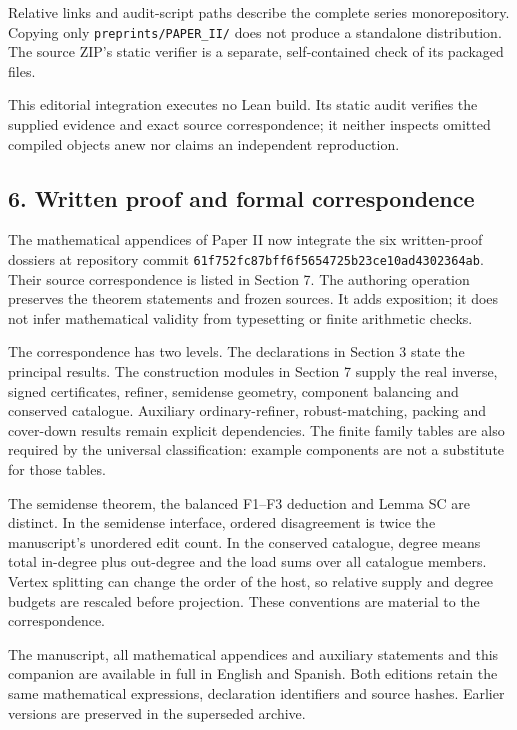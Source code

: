 \documentclass[english,11pt,a4paper]{article}
\begin{document}
Relative links and audit-script paths describe the complete series monorepository. Copying only \texttt{preprints/\allowbreak{}PA\allowbreak{}PER\_\allowbreak{}II/\allowbreak{}} does not produce a standalone distribution. The source ZIP's static verifier is a separate, self-contained check of its packaged files.

This editorial integration executes no Lean build. Its static audit verifies the supplied evidence and exact source correspondence; it neither inspects omitted compiled objects anew nor claims an independent reproduction.

\subsection{6. Written proof and formal correspondence}\label{written-proof-and-formal-correspondence}

The mathematical appendices of Paper II now integrate the six written-proof dossiers at repository commit \texttt{61f752fc\allowbreak{}87bf\allowbreak{}f6f5\allowbreak{}654725b2\allowbreak{}\allowbreak{}3ce10ad4\allowbreak{}3023\allowbreak{}64ab\allowbreak{}}. Their source correspondence is listed in Section 7. The authoring operation preserves the theorem statements and frozen sources. It adds exposition; it does not infer mathematical validity from typesetting or finite arithmetic checks.

The correspondence has two levels. The declarations in Section 3 state the principal results. The construction modules in Section 7 supply the real inverse, signed certificates, refiner, semidense geometry, component balancing and conserved catalogue. Auxiliary ordinary-refiner, robust-matching, packing and cover-down results remain explicit dependencies. The finite family tables are also required by the universal classification: example components are not a substitute for those tables.

The semidense theorem, the balanced F1--F3 deduction and Lemma SC are distinct. In the semidense interface, ordered disagreement is twice the manuscript's unordered edit count. In the conserved catalogue, degree means total in-degree plus out-degree and the load sums over all catalogue members. Vertex splitting can change the order of the host, so relative supply and degree budgets are rescaled before projection. These conventions are material to the correspondence.

The manuscript, all mathematical appendices and auxiliary statements and this companion are available in full in English and Spanish. Both editions retain the same mathematical expressions, declaration identifiers and source hashes. Earlier versions are preserved in the superseded archive.
\end{document}
